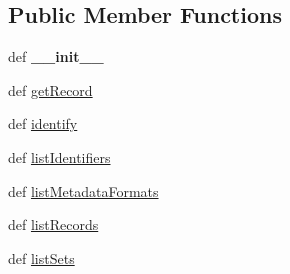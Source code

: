 \subsection*{Public Member Functions}
\begin{DoxyCompactItemize}
\item 
\hypertarget{classcheshire3_1_1web_1_1oaipmh_handler_1_1_cheshire3_oai_server_adc8889ec93b3a2315181fa24f791b6ad}{def {\bfseries \-\_\-\-\_\-init\-\_\-\-\_\-}}\label{classcheshire3_1_1web_1_1oaipmh_handler_1_1_cheshire3_oai_server_adc8889ec93b3a2315181fa24f791b6ad}

\item 
def \hyperlink{classcheshire3_1_1web_1_1oaipmh_handler_1_1_cheshire3_oai_server_a18cfbc074db487fb0b9ca36718148e17}{get\-Record}
\item 
def \hyperlink{classcheshire3_1_1web_1_1oaipmh_handler_1_1_cheshire3_oai_server_a2f8a3a76f81d952a980ec31d103e2d78}{identify}
\item 
def \hyperlink{classcheshire3_1_1web_1_1oaipmh_handler_1_1_cheshire3_oai_server_af4c971028461682093c67f83422752fc}{list\-Identifiers}
\item 
def \hyperlink{classcheshire3_1_1web_1_1oaipmh_handler_1_1_cheshire3_oai_server_a886454de0fe11a2fc8c9b68ae5fb2d8d}{list\-Metadata\-Formats}
\item 
def \hyperlink{classcheshire3_1_1web_1_1oaipmh_handler_1_1_cheshire3_oai_server_a2aeeed3b3ca12c25dee58feaec685f54}{list\-Records}
\item 
def \hyperlink{classcheshire3_1_1web_1_1oaipmh_handler_1_1_cheshire3_oai_server_a2e867b11e46a5504c7be405f6a398a25}{list\-Sets}
\end{DoxyCompactItemize}
